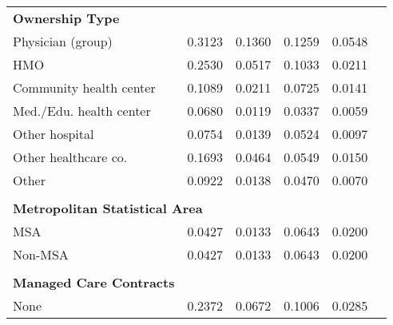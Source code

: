 \documentclass[12pt]{report}
\begin{document}
{\begin{center}
\begin{longtable}{lccccc}
\textbf{Ownership Type}                &                          &                     &                           &                      \\
Physician (group)           & 0.3123                   & 0.1360              & 0.1259                    & 0.0548               \\
HMO  & 0.2530                   & 0.0517              & 0.1033                    & 0.0211               \\
Community health center                & 0.1089                   & 0.0211              & 0.0725                    & 0.0141               \\
Med./Edu. health center         & 0.0680                   & 0.0119              & 0.0337                    & 0.0059               \\
Other hospital                         & 0.0754                   & 0.0139              & 0.0524                    & 0.0097               \\
Other healthcare co.          & 0.1693                   & 0.0464              & 0.0549                    & 0.0150               \\
Other                                  & 0.0922                   & 0.0138              & 0.0470                    & 0.0070               \\
                                       &                          &                     &                           &                      \\
\multicolumn{2}{l}{\textbf{Metropolitan Statistical Area}}                           &                     &                           &                      \\
MSA                                    & 0.0427                   & 0.0133              & 0.0643                    & 0.0200               \\
Non-MSA                                & 0.0427                   & 0.0133              & 0.0643                    & 0.0200               \\
                                       &                          &                     &                           &                      \\
\textbf{Managed Care Contracts}        &                          &                     &                           &                      \\
None                                   & 0.2372                   & 0.0672              & 0.1006                    & 0.0285               \\

\end{longtable}
\end{center}}
\end{document}
